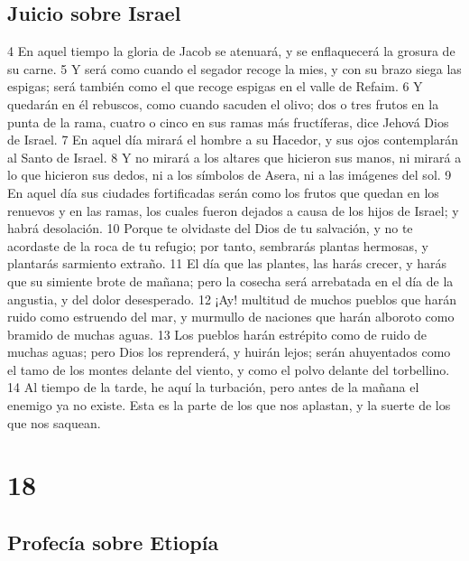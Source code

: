 \section*{Juicio sobre Israel}

4 En aquel tiempo la gloria de Jacob se atenuará, y se enflaquecerá la grosura de su carne.
5 Y será como cuando el segador recoge la mies, y con su brazo siega las espigas; será también como el que recoge espigas en el valle de Refaim.
6 Y quedarán en él rebuscos, como cuando sacuden el olivo; dos o tres frutos en la punta de la rama, cuatro o cinco en sus ramas más fructíferas, dice Jehová Dios de Israel.
7 En aquel día mirará el hombre a su Hacedor, y sus ojos contemplarán al Santo de Israel.
8 Y no mirará a los altares que hicieron sus manos, ni mirará a lo que hicieron sus dedos, ni a los símbolos de Asera, ni a las imágenes del sol.
9 En aquel día sus ciudades fortificadas serán como los frutos que quedan en los renuevos y en las ramas, los cuales fueron dejados a causa de los hijos de Israel; y habrá desolación.
10 Porque te olvidaste del Dios de tu salvación, y no te acordaste de la roca de tu refugio; por tanto, sembrarás plantas hermosas, y plantarás sarmiento extraño.
11 El día que las plantes, las harás crecer, y harás que su simiente brote de mañana; pero la cosecha será arrebatada en el día de la angustia, y del dolor desesperado.
12 ¡Ay! multitud de muchos pueblos que harán ruido como estruendo del mar, y murmullo de naciones que harán alboroto como bramido de muchas aguas.
13 Los pueblos harán estrépito como de ruido de muchas aguas; pero Dios los reprenderá, y huirán lejos; serán ahuyentados como el tamo de los montes delante del viento, y como el polvo delante del torbellino.
14 Al tiempo de la tarde, he aquí la turbación, pero antes de la mañana el enemigo ya no existe. Esta es la parte de los que nos aplastan, y la suerte de los que nos saquean.

\chapter{18}

\section*{Profecía sobre Etiopía}

